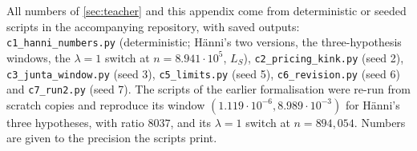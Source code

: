 All numbers of \cref{sec:teacher} and this appendix come from deterministic or seeded scripts in the accompanying repository, with saved outputs: \texttt{c1\_\allowbreak{}hanni\_\allowbreak{}numbers.py} (deterministic; H\"anni's two versions, the three-hypothesis windows, the $\lambda=1$ switch at $n=8.941\cdot10^5$, $L_S$), \texttt{c2\_\allowbreak{}pricing\_\allowbreak{}kink.py} (seed 2), \texttt{c3\_\allowbreak{}junta\_\allowbreak{}window.py} (seed 3), \texttt{c5\_\allowbreak{}limits.py} (seed 5), \texttt{c6\_\allowbreak{}revision.py} (seed 6) and \texttt{c7\_\allowbreak{}run2.py} (seed 7). The scripts of the earlier formalisation \citep[section ``Simplicity and normativity from imitation'']{claude2026whatfollows} were re-run from scratch copies and reproduce its window $(1.119\cdot10^{-6},8.989\cdot10^{-3})$ for H\"anni's three hypotheses, with ratio $8037$, and its $\lambda=1$ switch at $n=894{,}054$. Numbers are given to the precision the scripts print.

